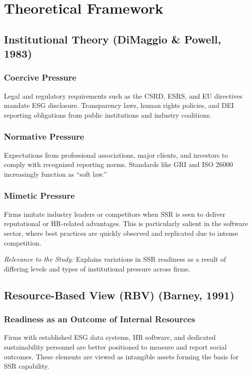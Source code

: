 \section{Theoretical Framework}

\subsection{Institutional Theory (DiMaggio \& Powell, 1983)}
\subsubsection{Coercive Pressure}
Legal and regulatory requirements such as the CSRD, ESRS, and EU directives mandate ESG disclosure. Transparency laws, human rights policies, and DEI reporting obligations from public institutions and industry coalitions.

\subsubsection{Normative Pressure}
Expectations from professional associations, major clients, and investors to comply with recognized reporting norms. Standards like GRI and ISO 26000 increasingly function as “soft law.”

\subsubsection{Mimetic Pressure}
Firms imitate industry leaders or competitors when SSR is seen to deliver reputational or HR-related advantages. This is particularly salient in the software sector, where best practices are quickly observed and replicated due to intense competition.

\textit{Relevance to the Study:} Explains variations in SSR readiness as a result of differing levels and types of institutional pressure across firms.

\subsection{Resource-Based View (RBV) (Barney, 1991)}
\subsubsection{Readiness as an Outcome of Internal Resources}
Firms with established ESG data systems, HR software, and dedicated sustainability personnel are better positioned to measure and report social outcomes. These elements are viewed as intangible assets forming the basis for SSR capability.


